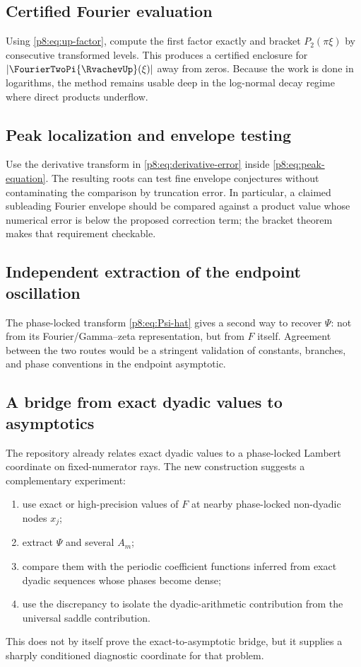 \documentclass[11pt]{article}
\numberwithin{equation}{section}
\theoremstyle{definition}
\theoremstyle{remark}
\begin{document}
\subsection{Certified Fourier evaluation}

Using \cref{p8:eq:up-factor}, compute the first factor exactly and bracket $P_2(\pi\xi)$ by consecutive transformed levels. This produces a certified enclosure for $|\FourierTwoPi{\RvachevUp}(\xi)|$ away from zeros. Because the work is done in logarithms, the method remains usable deep in the log-normal decay regime where direct products underflow.

\subsection{Peak localization and envelope testing}

Use the derivative transform in \cref{p8:eq:derivative-error} inside \cref{p8:eq:peak-equation}. The resulting roots can test fine envelope conjectures without contaminating the comparison by truncation error. In particular, a claimed subleading Fourier envelope should be compared against a product value whose numerical error is below the proposed correction term; the bracket theorem makes that requirement checkable.

\subsection{Independent extraction of the endpoint oscillation}

The phase-locked transform \cref{p8:eq:Psi-hat} gives a second way to recover $\Psi$: not from its Fourier/Gamma--zeta representation, but from $F$ itself. Agreement between the two routes would be a stringent validation of constants, branches, and phase conventions in the endpoint asymptotic.

\subsection{A bridge from exact dyadic values to asymptotics}

The repository already relates exact dyadic values to a phase-locked Lambert coordinate on fixed-numerator rays. The new construction suggests a complementary experiment:
\begin{enumerate}
\item use exact or high-precision values of $F$ at nearby phase-locked non-dyadic nodes $x_j$;
\item extract $\Psi$ and several $A_m$;
\item compare them with the periodic coefficient functions inferred from exact dyadic sequences whose phases become dense;
\item use the discrepancy to isolate the dyadic-arithmetic contribution from the universal saddle contribution.
\end{enumerate}
This does not by itself prove the exact-to-asymptotic bridge, but it supplies a sharply conditioned diagnostic coordinate for that problem.
\end{document}

